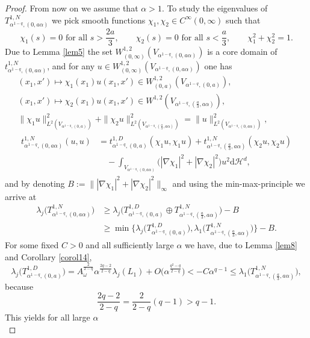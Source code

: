 \documentclass[11pt,oneside,reqno,a4paper]{amsart}
\newcommand{\dd}{\mathrm{d}}
\renewcommand{\H}{\mathcal{H}}
\theoremstyle{definition}
\begin{document}
\begin{proof}
From now on we assume that $\alpha>1$. To study the eigenvalues of $T^{1,N}_{\alpha^{1-q},(0,a\alpha)}$
we pick smooth functions $\chi_1,\chi_2\in C^\infty (0,\infty)$ such that
	\[
	\chi_1(s)=0 \text{ for all }s>\frac{2a}{3},\qquad \chi_2(s)=0 \text{ for all }s<\frac{a}{3},
	\qquad
	\chi_1^2+\chi_2^2=1.
	\]	
Due to Lemma \ref{lem5} the set $W^{1,2}_{(0,\infty)}(V_{\alpha^{1-q},(0,a\alpha)})$ is a core domain of $t^{1,N}_{\alpha^{1-q},(0,a\alpha)}$, and for any $u\in W^{1,2}_{(0,\infty)}(V_{\alpha^{1-q},(0,a\alpha)})$ one has
\begin{gather*}
	(x_1,x')\mapsto \chi_1(x_1) u(x_1,x')\in W^{1,2}_{(0,a)}(V_{\alpha^{1-q},(0,a)}),\\
	(x_1,x')\mapsto \chi_2(x_1) u(x_1,x')\in W^{1,2}(V_{\alpha^{1-q},(\frac{a}{3},a\alpha)}),\\
	\|\chi_1 u\|^2_{L^2(V_{\alpha^{1-q},(0,a)})}+\|\chi_2 u\|^2_{L^2(V_{\alpha^{1-q},(\frac{a}{3},a\alpha)})}=\|u\|^2_{L^2(V_{\alpha^{1-q},(0,a\alpha)})},\\
\begin{aligned}
	t^{1,N}_{\alpha^{1-q},(0,a\alpha)}(u,u)&=	t^{1,D}_{\alpha^{1-q},(0,a)}(\chi_1 u,\chi_1 u)+
t^{1,N}_{\alpha^{1-q},(\frac{a}{3},a\alpha)}(\chi_2 u,\chi_2 u)\\ &\quad-\int_{V_{\alpha^{1-q},(0,a\alpha)}} \big(|\nabla\chi_1|^2+|\nabla\chi_2|^2\big)u^2\dd \H^d,
\end{aligned}
\end{gather*}
and by denoting $B:=\big\||\nabla\chi_1|^2+|\nabla\chi_2|^2\big\|_\infty$
and using the min-max-principle we arrive at
\begin{align*}
	\lambda_j\big(T^{1,N}_{\alpha^{1-q},(0,a\alpha)}\big)&\ge \lambda_j\Big(
	T^{1,D}_{\alpha^{1-q},(0,a)}\oplus T^{1,N}_{\alpha^{1-q},(\frac{a}{3},a\alpha)}\Big)-B\\
	&\ge \min\Big\{\lambda_j\Big(
	T^{1,D}_{\alpha^{1-q},(0,a)}\Big),\lambda_1\Big(
	T^{1,N}_{\alpha^{1-q},(\frac{a}{3},a\alpha)}\Big)
	\Big\}-B.
\end{align*}
For some fixed $C>0$ and all sufficiently large $\alpha$ we have, due to Lemma \ref{lem8} and Corollary \ref{corol14},
\[
\lambda_j\Big(
T^{1,D}_{\alpha^{1-q},(0,a)}\Big)=
A_\omega^\frac{2}{2-q}\alpha^\frac{2q-2}{2-q}\lambda_j(L_1)+O\Big(\alpha^{\frac{q^2-q}{2-q}}\Big)
< -C\alpha^{q-1}\le \lambda_1\Big(
T^{1,N}_{\alpha^{1-q},(\frac{a}{3},a\alpha)}\Big),
\]	
because
\[
\dfrac{2q-2}{2-q}=\dfrac{2}{2-q} (q-1)>q-1.
\]
This yields for all large $\alpha$ 
\[
\]
\end{proof}
\end{document}
